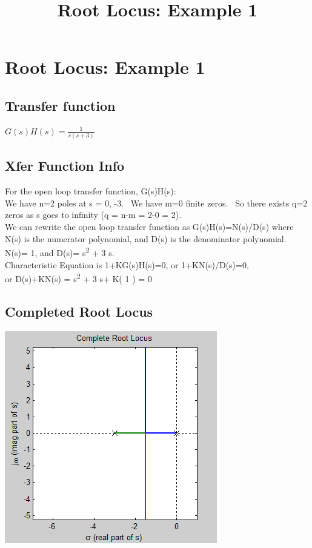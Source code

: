 \documentclass[16pt]{article}
\title{Root Locus: Example 1}
\date{}
\begin{document}
\maketitle


\section{Root Locus: Example 1}\label{root-locus-example-1}

\subsection{Transfer function}\label{transfer-function}
$\displaystyle G(s)H(s)= \frac{1}{s(s+3)}$

\subsection[Xfer Function
Info]{\texorpdfstring{\protect\hypertarget{BckGrnd}{}{}Xfer Function
Info}{Xfer Function Info}}\label{xfer-function-info}

For the open loop transfer function, G(s)H(s):\\
We have n=2 poles at s = 0, -3.~ We have m=0 finite zeros.~ So there
exists q=2 zeros as s goes to infinity (q = n-m = 2-0 =
2).\\[2\baselineskip]We can rewrite the open loop transfer function as
G(s)H(s)=N(s)/D(s) where N(s) is the numerator polynomial, and D(s) is
the denominator polynomial.~\\
N(s)= 1, and D(s)= s\textsuperscript{2} + 3
s.\\[2\baselineskip]Characteristic Equation is 1+KG(s)H(s)=0, or
1+KN(s)/D(s)=0,\\
or D(s)+KN(s) = s\textsuperscript{2} + 3 s+ K( 1 ) = 0\\

\subsection{Completed Root Locus}\label{completed-root-locus}

\includegraphics{./Root Locus_ Example 1_files/RLTotal.png}
\end{document}
